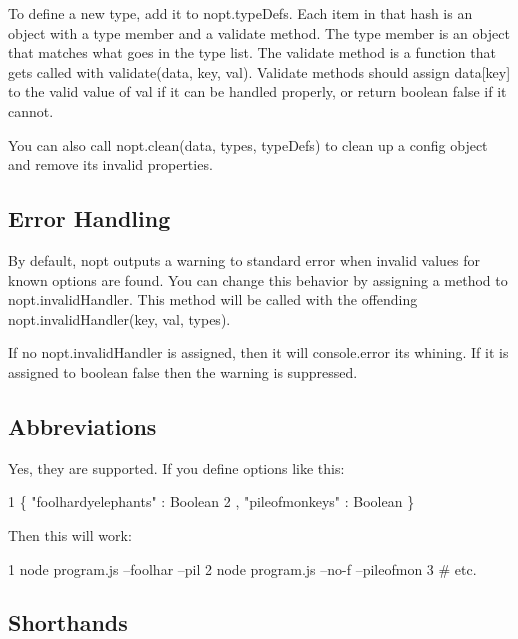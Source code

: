 To define a new type, add it to {\ttfamily nopt.\+type\+Defs}. Each item in that hash is an object with a {\ttfamily type} member and a {\ttfamily validate} method. The {\ttfamily type} member is an object that matches what goes in the type list. The {\ttfamily validate} method is a function that gets called with {\ttfamily validate(data, key, val)}. Validate methods should assign {\ttfamily data\mbox{[}key\mbox{]}} to the valid value of {\ttfamily val} if it can be handled properly, or return boolean {\ttfamily false} if it cannot.

You can also call {\ttfamily nopt.\+clean(data, types, type\+Defs)} to clean up a config object and remove its invalid properties.

\subsection*{Error Handling}

By default, nopt outputs a warning to standard error when invalid values for known options are found. You can change this behavior by assigning a method to {\ttfamily nopt.\+invalid\+Handler}. This method will be called with the offending {\ttfamily nopt.\+invalid\+Handler(key, val, types)}.

If no {\ttfamily nopt.\+invalid\+Handler} is assigned, then it will console.\+error its whining. If it is assigned to boolean {\ttfamily false} then the warning is suppressed.

\subsection*{Abbreviations}

Yes, they are supported. If you define options like this\+:


\begin{DoxyCode}
1 \{ "foolhardyelephants" : Boolean
2 , "pileofmonkeys" : Boolean \}
\end{DoxyCode}


Then this will work\+:


\begin{DoxyCode}
1 node program.js --foolhar --pil
2 node program.js --no-f --pileofmon
3 # etc.
\end{DoxyCode}


\subsection*{Shorthands}

